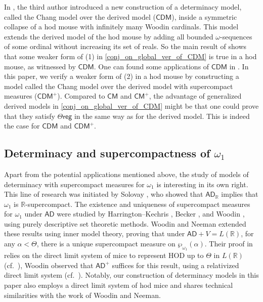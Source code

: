 \documentclass{amsart}
\begin{document}
In \cite{CoveringChang}, the third author introduced a new construction of a determinacy model, called the Chang model over the derived model ($\mathsf{CDM}$), inside a symmetric collapse of a hod mouse with infinitely many Woodin cardinals.
This model extends the derived model of the hod mouse by adding all bounded $\omega$-sequences of some ordinal without increasing its set of reals.
So the main result of \cite{CoveringChang} shows that some weaker form of (1) in \cref{conj_on_global_ver_of_CDM} is true in a hod mouse, as witnessed by $\mathsf{CDM}$.
One can found some applications of $\mathsf{CDM}$ in \cite{omega_strongly_meas_in_Pmax,Det_in_Chang_model}.
In this paper, we verify a weaker form of (2) in a hod mouse by constructing a model called the Chang model over the derived model with supercompact measures ($\mathsf{CDM}^+$).
Compared to $\mathsf{CM}$ and $\mathsf{CM}^+$, the advantage of generalized derived models in \cref{conj_on_global_ver_of_CDM} might be that one could prove that they satisfy $\Theta\mathsf{reg}$ in the same way as for the derived model.
This is indeed the case for $\mathsf{CDM}$ and $\mathsf{CDM}^+$.

\subsection{Determinacy and supercompactness of $\omega_1$}

Apart from the potential applications mentioned above, the study of models of determinacy with supercompact measures for $\omega_1$ is interesting in its own right.
This line of research was initiated by Solovay \cite{So21}, who showed that $\mathsf{AD}_{\mathbb{R}}$ implies that $\omega_1$ is $\mathbb{R}$-supercompact.
The existence and uniqueness of supercompact measures for $\omega_1$ under $\mathsf{AD}$ were studied by Harrington--Kechris \cite{HaKe81}, Becker \cite{Be81}, and Woodin \cite{Wo20}, using purely descriptive set theoretic methods.
Woodin and Neeman \cite{Neeman07} extended these results using inner model theory, proving that under $\mathsf{AD} + V = L(\mathbb{R})$, for any $\alpha < \Theta$, there is a unique supercompact measure on $\wp_{\omega_1}(\alpha)$.
Their proof in \cite{Neeman07} relies on the direct limit system of mice to represent HOD up to $\Theta$ in $L(\mathbb{R})$ (cf.\ \cite{StW16}),
Woodin observed that $\mathsf{AD}^+$ suffices for this result, using a relativized direct limit system (cf.\ \cite{St16, Sar21}).
Notably, our construction of determinacy models in this paper also employs a direct limit system of hod mice and shares technical similarities with the work of Woodin and Neeman.
\end{document}
